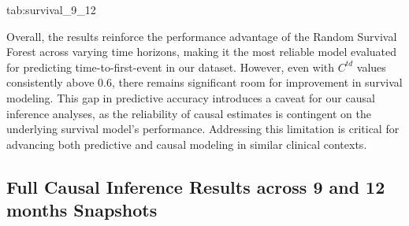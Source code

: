\begin{table}[!htbp]
    \setlength{\tabcolsep}{2pt}
    \floatconts
      {tab:survival_9_12}
      {\caption{Prediction Performance Across Time Snapshots (9 and 12 months)}\vspace{-.75em}}
      {}
\end{table}

Overall, the results reinforce the performance advantage of the Random Survival Forest across varying time horizons, making it the most reliable model evaluated for predicting time-to-first-event in our dataset.
However, even with \(C^{td}\) values consistently above 0.6, there remains significant room for improvement in survival modeling.
This gap in predictive accuracy introduces a caveat for our causal inference analyses, as the reliability of causal estimates is contingent on the underlying survival model's performance.
Addressing this limitation is critical for advancing both predictive and causal modeling in similar clinical contexts.

\subsection{Full Causal Inference Results across 9 and 12 months Snapshots}
\label{apd:causal_inference}

